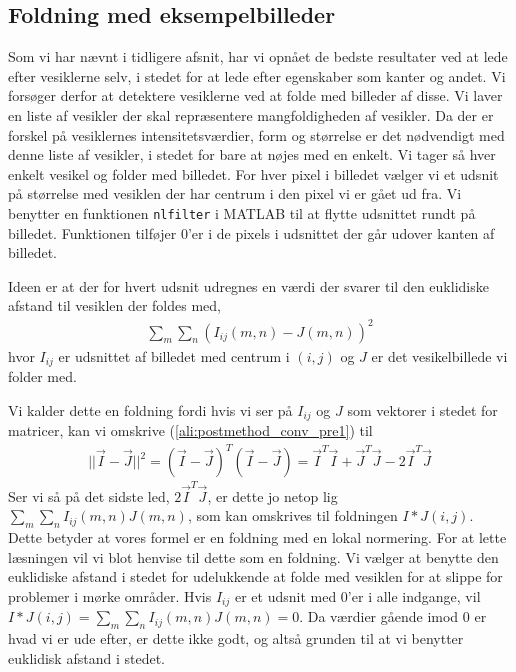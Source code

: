 \subsection{Foldning med eksempelbilleder}
Som vi har nævnt i tidligere afsnit, har vi opnået de bedste resultater ved at lede efter vesiklerne selv, i stedet for at lede efter egenskaber som kanter og andet. Vi forsøger derfor at detektere vesiklerne ved at folde med billeder af disse. Vi laver en liste af vesikler der skal repræsentere mangfoldigheden af vesikler. Da der er forskel på vesiklernes intensitetsværdier, form og størrelse er det nødvendigt med denne liste af vesikler, i stedet for bare at nøjes med en enkelt. Vi tager så hver enkelt vesikel og folder med billedet. For hver pixel i billedet vælger vi et udsnit på størrelse med vesiklen der har centrum i den pixel vi er gået ud fra. Vi benytter en funktionen \texttt{nlfilter} i MATLAB til at flytte udsnittet rundt på billedet. Funktionen tilføjer 0'er i de pixels i udsnittet der går udover kanten af billedet.

Ideen er at der for hvert udsnit udregnes en værdi der svarer til den euklidiske afstand til vesiklen der foldes med,
\begin{align}
	\sum_m\sum_n\left(I_{ij}(m,n)-J(m,n)\right)^2\label{ali:postmethod_conv_pre1}
\end{align}
hvor $I_{ij}$ er udsnittet af billedet med centrum i $(i,j)$ og $J$ er det vesikelbillede vi folder med. 

Vi kalder dette en foldning fordi hvis vi ser på $I_{ij}$ og $J$ som vektorer i stedet for matricer, kan vi omskrive (\ref{ali:postmethod_conv_pre1}) til
\begin{align}
	||\vec{I}-\vec{J}||^2 = (\vec{I}-\vec{J})^T(\vec{I}-\vec{J}) = \vec{I}^T\vec{I} + \vec{J}^T\vec{J}-2\vec{I}^T\vec{J}
\end{align}
Ser vi så på det sidste led, $2\vec{I}^T\vec{J}$, er dette jo netop lig $\sum_m\sum_nI_{ij}(m,n)J(m,n)$, som kan omskrives til foldningen $I*J(i,j)$. Dette betyder at vores formel er en foldning med en lokal normering. For at lette læsningen vil vi blot henvise til dette som en foldning. Vi vælger at benytte den euklidiske afstand i stedet for udelukkende at folde med vesiklen for at slippe for problemer i mørke områder. Hvis $I_{ij}$ er et udsnit med 0'er i alle indgange, vil $I*J(i,j)=\sum_m\sum_nI_{ij}(m,n)J(m,n)=0$. Da værdier gående imod 0 er hvad vi er ude efter, er dette ikke godt, og altså grunden til at vi benytter euklidisk afstand i stedet.

